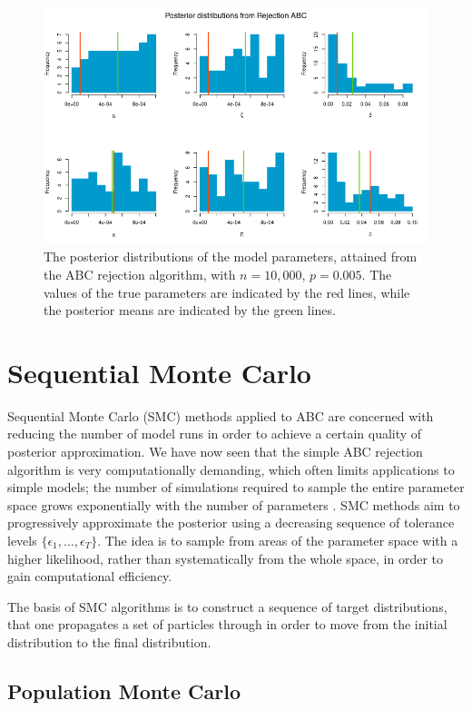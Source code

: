 \documentclass[]{article}
\begin{document}
\begin{figure}[H]
	\centering
	\includegraphics[width=1\linewidth]{../Figures/rejection_posteriors}
	\caption{The posterior distributions of the model parameters, attained from the ABC rejection algorithm, with $n=10,000$, $p=0.005$. The values of the true parameters are indicated by the red lines, while the posterior means are indicated by the green lines.}
	\label{rej_abc_posteriors}
\end{figure}


\section{Sequential Monte Carlo}

Sequential Monte Carlo (SMC) methods applied to ABC are concerned with reducing the number of model runs in order to achieve a certain quality of posterior approximation. We have now seen that the simple ABC rejection algorithm is very computationally demanding, which often limits applications to simple models; the number of simulations required to sample the entire parameter space grows exponentially with the number of parameters \citep{RN32}. SMC methods aim to progressively approximate the posterior using a decreasing sequence of tolerance levels $\{\epsilon_1, ..., \epsilon_T\}$. The idea is to sample from areas of the parameter space with a higher likelihood, rather than systematically from the whole space, in order to gain computational efficiency.

The basis of SMC algorithms is to construct a sequence of target distributions, that one propagates a set of particles through in order to move from the initial distribution to the final distribution. 

\subsection{Population Monte Carlo}
\end{document}
